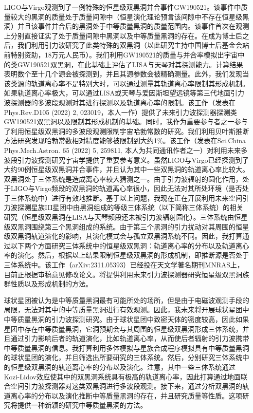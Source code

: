 \documentclass[12pt,a4paper,sans]{article}%
\begin{document}
\begin{CJK}{UTF8}{gbsn}
	LIGO与Virgo观测到了一例特殊的恒星级双黑洞并合事件GW190521。该事件中质量较大的黑洞的质量处于质量间隙中（恒星演化理论预言该间隙中不存在恒星级黑洞）并且该事件并合后的黑洞处于中等质量黑洞的质量范围内。该事件首次在观测上分别直接证实了处于质量间隙中黑洞以及中等质量黑洞的存在。在成为博士后之后，我们利用引力波研究了此类特殊的双黑洞（以此研究主持中国博士后基金会站前特别资助，18万元人民币）。我们利用GW190521的质量与并合率模拟出宇宙中的类GW190521双黑洞，在此基础上评估了LISA与天琴对其探测能力。计算结果表明数个至十几个源会被探测到，并且其源参数会被精确测量。此外，我们发现当该类源的轨道离心率不是特别大时，可以通过测量其轨道离心率限制其形成机制。如果轨道离心率极大，可以通过LISA或天琴与爱因斯坦望远镜等第三代地面引力波探测器的多波段观测对其进行探测以及轨道离心率的限制。该工作（发表在Phys.Rev.D105 (2022) 2, 023019，本人一作）提供了未来引力波探测器探测类GW190521双黑洞以及限制其形成机制的基础。同时，我作为重要参与者之一参与了利用恒星级双黑洞的多波段观测限制宇宙哈勃常数的研究。我们利用贝叶斯推断方法研究发现哈勃常数相对精度能够被限制到大约1\%。该工作（发表在Sci.China Phys.Mech.Astron. 65 (2022) 5, 259811, 本人为共同通讯作者之一）对利用未来多波段引力波探测研究宇宙学提供了重要参考意义。虽然LIGO与Virgo已经探测到了大约90例恒星级双黑洞并合事件，并且认为其中一些双黑洞的轨道离心率比较大。双黑洞处于三体系统是造成离心率较大猜测之一。由于引力波辐射的圆化作用，处于LIGO与Virgo频段的双黑洞的轨道离心率很小，因此无法对其所处环境（是否处于三体系统中）进行有效地推断。基于以上问题，我现在正在开展利用未来空间引力波探测星族III星团中由黑洞组成的等级三体系统（以下简称三体系统）的相关研究（恒星级双黑洞在LISA与天琴频段还未被引力波辐射园化）。三体系统由恒星级双黑洞围绕第三个黑洞组成的系统。由于第三个黑洞的引力扰动对其周围的恒星级双黑洞轨道演化的影响，其演化模式会与孤立双黑洞系统不同。因此，我打算通过以下两个方面研究三体系统中的恒星级双黑洞：轨道离心率的分布以及轨道离心率的演化。然后，根据以上结果限制恒星级双黑洞的形成机制，即推断源是否处于三体系统中。该工作（arXiv:2311.05393）已经投在天文学著名期刊MNRAS上，目前正根据审稿意见修改论文。将提供利用未来引力波探测器研究恒星级双黑洞族群性质以及形成机制的方法。

	球状星团被认为是中等质量黑洞最有可能所处的场所，但是由于电磁波观测手段的局限，无法对其中的中等质量黑洞进行有效观测。因此，我未来将开展球状星团中中等质量黑洞的引力波探测研究。由于球状星团中致密天体的密度较高，因此如果星团中存在中等质量黑洞，它洞预期会与其周围的恒星级双黑洞形成三体系统，并且通过引力影响后者的轨道演化，比如轨道离心率，从而使后者辐射的引力波携带中等质量黑洞的信息。我打算利用多体模拟与星族合成程序模拟具有中等质量黑洞的球状星团的演化，并且筛选出所要研究的三体系统。然后，分别研究三体系统中的恒星级双黑洞的轨道离心率的分布以及演化。注意，其中一些三体系统通过Kozi-Lidov效应使其中的双黑洞系统具有极高的轨道离心率，因此打算通过地面联合空间引力波探测器对这类双黑洞进行多波段观测。接下来，通过分析双黑洞的轨道离心率的分布以及演化推断中等质量黑洞的存在，并且研究质量等性质。这项研究将提供一种新颖的研究中等质量黑洞的方法。


\end{CJK}
\end{document}
